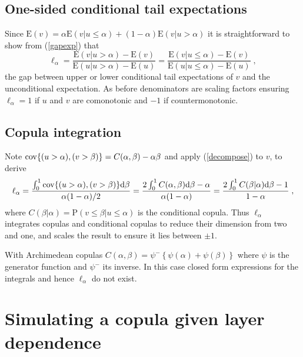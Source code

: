 \documentclass[authoryear]{elsarticle}
\newcommand{\cov}{{\rm cov}}
\newcommand{\E}{{\mathrm E}}
\newcommand{\de}{\mathrm{d}}
\newcommand{\p}{\mathrm{P}}
\newcommand{\eref}[1]{(\ref{#1})}
\begin{document}
\subsection{One-sided conditional tail expectations}


Since $\E(v)=\alpha\E(v|u\leq \alpha)+(1-\alpha)\E(v|u>\alpha)$ it is straightforward to show from \eref{gapexp} that
$$
\ell_\alpha = \frac{\E(v|u> \alpha)-\E(v)}{\E(u|u> \alpha)-\E(u)} = \frac{\E(v|u\leq \alpha)-\E(v)}{\E(u|u\leq \alpha)-\E(u)} \;,
$$
the gap between upper or lower conditional tail expectations of $v$ and the unconditional expectation. As before denominators are scaling factors ensuring $\ell_\alpha=1$ if $u$ and $v$ are comonotonic and $-1$ if countermonotonic.

\subsection{Copula integration}

Note $\cov\{(u>\alpha),(v>\beta)\}=C(\alpha,\beta)-\alpha\beta$ and apply \eref{decompose} to $v$, to derive
$$
\ell_\alpha = \frac{\int_0^1 \cov\{(u>\alpha),(v>\beta)\} \de\beta }{\alpha(1-\alpha)/2}
= \frac{2 \int_0^1 C(\alpha,\beta) \de \beta- \alpha}{\alpha(1-\alpha)} = \frac{2 \int_0^1 C(\beta|\alpha) \de \beta- 1}{1-\alpha}\;,
$$
where $C(\beta|\alpha)=\p(v\le\beta|u\le\alpha)$ is the conditional copula. Thus $\ell_\alpha$ integrates copulas and conditional copulas to reduce their dimension from two and one, and scales the result to ensure it lies between $\pm 1$.

With Archimedean copulas \citep{mcneil2005qrm} $C(\alpha,\beta) =\psi^-\left\{\psi(\alpha)+\psi(\beta)\right\}$ where $\psi$ is the generator function and $\psi^-$ its inverse. In this case closed form expressions for the integrals and hence $\ell_\alpha$ do not exist.



\section{Simulating a copula given layer dependence}\label{smodeling}
\end{document}
